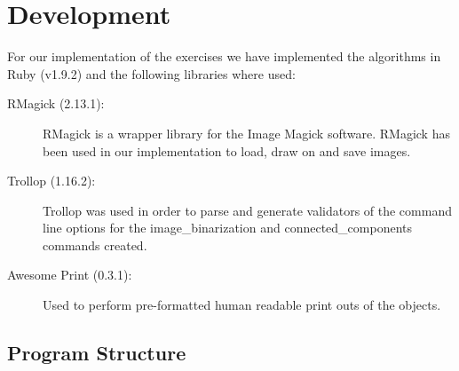 \documentclass[a4paper,10pt,titlepage]{article}
\begin{document}
\section{Development}
\par For our implementation of the exercises we have implemented the algorithms in Ruby (v1.9.2) and the following libraries where used: 
\begin{description}
	\item[RMagick (2.13.1):] RMagick is a wrapper library for the Image Magick software. RMagick has been used in our implementation to load, draw on and save images. 
	\item[Trollop (1.16.2):] Trollop was used in order to parse and generate validators of the command line options for the image\_binarization and connected\_components commands created.  
	\item[Awesome Print (0.3.1):] Used to perform pre-formatted human readable print outs of the objects.
\end{description}

\subsection{Program Structure}
\end{document}
